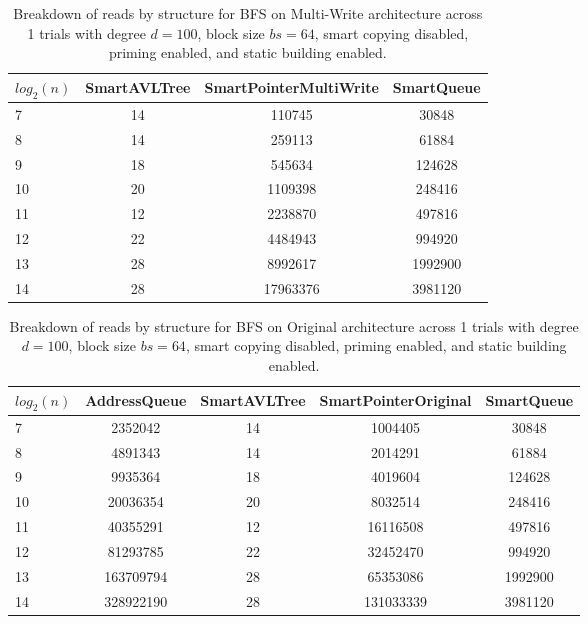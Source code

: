 \begin{table}[]
\centering
\begin{tabular}{|l|c|c|c|}
$log_2(n)$ & SmartAVLTree & SmartPointerMultiWrite & SmartQueue \\ \hline
7 & 14 & 110745 & 30848 \\ \hline
8 & 14 & 259113 & 61884 \\ \hline
9 & 18 & 545634 & 124628 \\ \hline
10 & 20 & 1109398 & 248416 \\ \hline
11 & 12 & 2238870 & 497816 \\ \hline
12 & 22 & 4484943 & 994920 \\ \hline
13 & 28 & 8992617 & 1992900 \\ \hline
14 & 28 & 17963376 & 3981120 \\ \hline
\end{tabular}
\caption{Breakdown of reads by structure for BFS on Multi-Write architecture across 1 trials with degree $d=100$, block size $bs=64$, smart copying disabled, priming enabled, and static building enabled.}
    \label{tab:reads_by_structure_bfs_d100_bs64_trials1_copiesfalse_primetrue_staticinsertiontrue_ptmultiwrite_movetrue}
\end{table}

\begin{table}[]
\centering
\begin{tabular}{|l|c|c|c|c|}
$log_2(n)$ & AddressQueue & SmartAVLTree & SmartPointerOriginal & SmartQueue \\ \hline
7 & 2352042 & 14 & 1004405 & 30848 \\ \hline
8 & 4891343 & 14 & 2014291 & 61884 \\ \hline
9 & 9935364 & 18 & 4019604 & 124628 \\ \hline
10 & 20036354 & 20 & 8032514 & 248416 \\ \hline
11 & 40355291 & 12 & 16116508 & 497816 \\ \hline
12 & 81293785 & 22 & 32452470 & 994920 \\ \hline
13 & 163709794 & 28 & 65353086 & 1992900 \\ \hline
14 & 328922190 & 28 & 131033339 & 3981120 \\ \hline
\end{tabular}
\caption{Breakdown of reads by structure for BFS on Original architecture across 1 trials with degree $d=100$, block size $bs=64$, smart copying disabled, priming enabled, and static building enabled.}
    \label{tab:reads_by_structure_bfs_d100_bs64_trials1_copiesfalse_primetrue_staticinsertiontrue_ptoriginal_movefalse}
\end{table}

